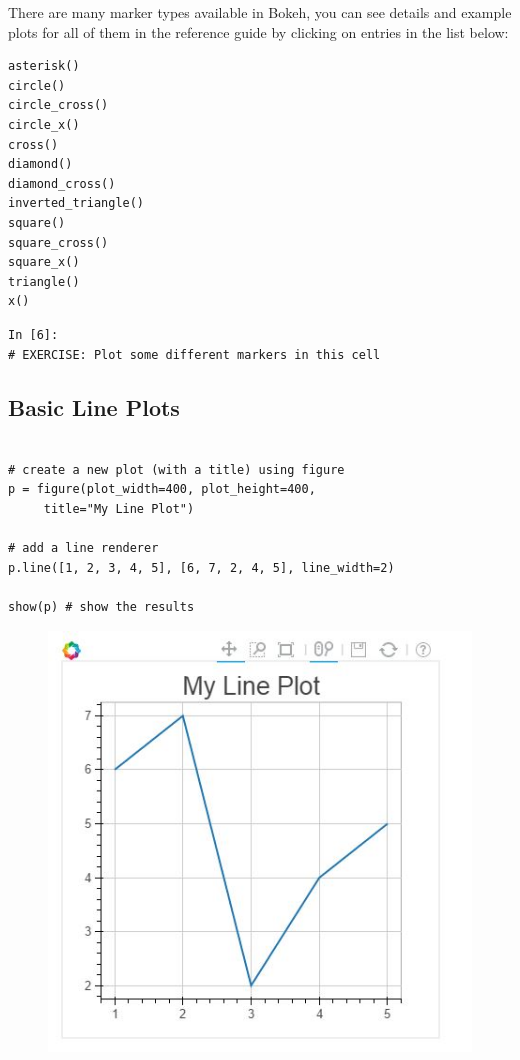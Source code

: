 \documentclass[a4paper,12pt]{article}
\begin{document}
There are many marker types available in Bokeh, you can see details and example plots for all of them in the reference guide by clicking on entries in the list below:
\begin{framed}
\begin{verbatim}
asterisk()
circle()
circle_cross()
circle_x()
cross()
diamond()
diamond_cross()
inverted_triangle()
square()
square_cross()
square_x()
triangle()
x()
\end{verbatim}
\end{framed}
\begin{framed}
	\begin{verbatim}
In [6]:
# EXERCISE: Plot some different markers in this cell

\end{verbatim}
\end{framed}
\newpage
\subsection{Basic Line Plots}
\begin{framed}
	\begin{verbatim}

# create a new plot (with a title) using figure
p = figure(plot_width=400, plot_height=400, 
     title="My Line Plot")

# add a line renderer
p.line([1, 2, 3, 4, 5], [6, 7, 2, 4, 5], line_width=2)

show(p) # show the results
\end{verbatim}
\end{framed}
\begin{figure}[h!]
\centering
\includegraphics[width=0.7\linewidth]{images/01-BasicPlot-LinePlot}
\end{figure}
\end{document}
